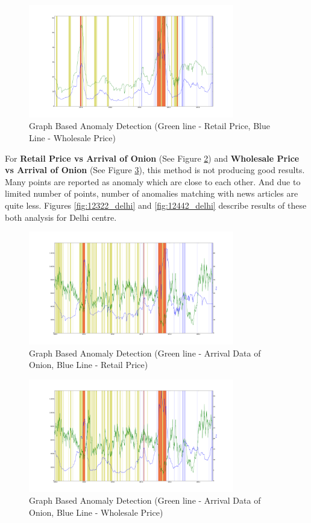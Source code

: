 \documentclass[a4paper,10pt]{report}
\begin{document}
			\begin{figure}[H]
		    	\centering
  		    	\includegraphics[width=0.8\textwidth]{graphs/12331.png}
		    	\caption{Graph Based Anomaly Detection (Green line - Retail Price, Blue Line - Wholesale Price)}
		    	\label{fig:12331}
			\end{figure}
	
	For \textbf{Retail Price vs Arrival of Onion} (See Figure \ref{fig:12321}) and \textbf{Wholesale Price vs Arrival of Onion} (See Figure \ref{fig:12341}), this method is not producing good results. Many points are reported as anomaly which are close to each other. And due to limited number of points, number of anomalies matching with news articles are quite less. Figures \ref{fig:12322_delhi} and \ref{fig:12442_delhi} describe results of these both analysis for Delhi centre.
			\begin{figure}[H]
		    	\centering
  		    	\includegraphics[width=0.8\textwidth]{graphs/12321.png}
		    	\caption{Graph Based Anomaly Detection (Green line - Arrival Data of Onion, Blue Line - Retail Price)}
		    	\label{fig:12321}
			\end{figure}
			
			\begin{figure}[H]
		    	\centering
  		    	\includegraphics[width=0.8\textwidth]{graphs/12341.png}
		    	\caption{Graph Based Anomaly Detection (Green line - Arrival Data of Onion, Blue Line - Wholesale Price)}
		    	\label{fig:12341}
			\end{figure}
			
\end{document}
